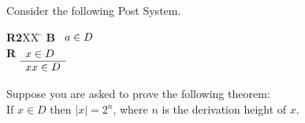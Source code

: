 \documentclass[addpoints]{exam}
\begin{document}
\begin{questions}
\question[2] Consider the following Post System.
\begin{tabbing}
{\bf R2}XX \=  \kill
{\bf B} \>
        \(\begin{array}[t]{l}
        a \in D
        \end{array}\) \\[2ex]
{\bf R} \>
        \(\begin{array}[t]{l}
        x \in D \\
        \hline
        xx \in D
        \end{array}\) 
\end{tabbing}

Suppose you are asked to prove the following theorem:\\
If $x \in D$ then $|x| = 2^n$, where $n$ is the derivation height
of $x$.\\
\begin{parts}

%
%
%
%
%
%
%
%



\end{parts}
\end{questions}
\end{document}

